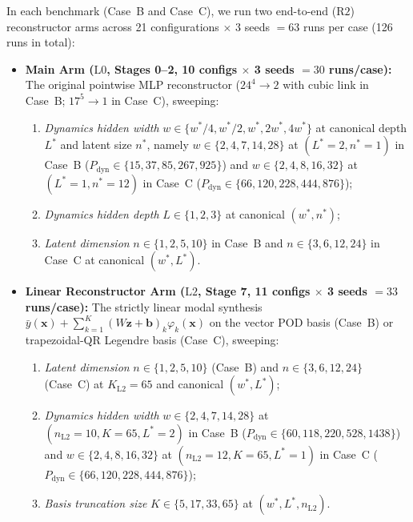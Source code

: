 In each benchmark (Case~B and Case~C), we run two end-to-end ($\mathrm{R2}$) reconstructor arms across 21 configurations $\times$ 3 seeds $= 63$ runs per case (126 runs in total):
\begin{itemize}[leftmargin=2em]
  \item \textbf{Main Arm ($\mathrm{L0}$, Stages 0--2, 10 configs $\times$ 3 seeds $= 30$ runs/case):} The original pointwise MLP reconstructor ($24^4\to 2$ with cubic link in Case~B; $17^5\to 1$ in Case~C), sweeping:
  \begin{enumerate}[label=(\alph*)]
    \item \emph{Dynamics hidden width} $w \in \{w^*/4, w^*/2, w^*, 2w^*, 4w^*\}$ at canonical depth $L^*$ and latent size $n^*$, namely $w \in \{2, 4, 7, 14, 28\}$ at $(L^*=2, n^*=1)$ in Case~B ($P_{\mathrm{dyn}} \in \{15, 37, 85, 267, 925\}$) and $w \in \{2, 4, 8, 16, 32\}$ at $(L^*=1, n^*=12)$ in Case~C ($P_{\mathrm{dyn}} \in \{66, 120, 228, 444, 876\}$);
    \item \emph{Dynamics hidden depth} $L \in \{1, 2, 3\}$ at canonical $(w^*, n^*)$;
    \item \emph{Latent dimension} $n \in \{1, 2, 5, 10\}$ in Case~B and $n \in \{3, 6, 12, 24\}$ in Case~C at canonical $(w^*, L^*)$.
  \end{enumerate}
  \item \textbf{Linear Reconstructor Arm ($\mathrm{L2}$, Stage 7, 11 configs $\times$ 3 seeds $= 33$ runs/case):} The strictly linear modal synthesis $\bar{y}(\mathbf{x}) + \sum_{k=1}^K (W\mathbf{z}+\mathbf{b})_k \varphi_k(\mathbf{x})$ on the vector POD basis (Case~B) or trapezoidal-QR Legendre basis (Case~C), sweeping:
  \begin{enumerate}[label=(\alph*)]
    \item \emph{Latent dimension} $n \in \{1, 2, 5, 10\}$ (Case~B) and $n \in \{3, 6, 12, 24\}$ (Case~C) at $K_{\mathrm{L2}} = 65$ and canonical $(w^*, L^*)$;
    \item \emph{Dynamics hidden width} $w \in \{2, 4, 7, 14, 28\}$ at $(n_{\mathrm{L2}}=10, K=65, L^*=2)$ in Case~B ($P_{\mathrm{dyn}} \in \{60, 118, 220, 528, 1438\}$) and $w \in \{2, 4, 8, 16, 32\}$ at $(n_{\mathrm{L2}}=12, K=65, L^*=1)$ in Case~C ($P_{\mathrm{dyn}} \in \{66, 120, 228, 444, 876\}$);
    \item \emph{Basis truncation size} $K \in \{5, 17, 33, 65\}$ at $(w^*, L^*, n_{\mathrm{L2}})$.
  \end{enumerate}
\end{itemize}


